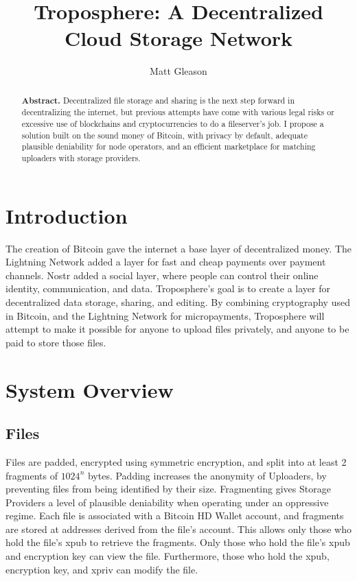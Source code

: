 \documentclass[12pt]{article}
\title{Troposphere: A Decentralized Cloud Storage Network}
\author{Matt Gleason}
\date{}
\begin{document}
\maketitle

\begin{abstract}\noindent \textbf{Abstract.} Decentralized file storage and sharing is the next step forward in decentralizing the internet, but previous attempts have come with various legal risks or excessive use of blockchains and cryptocurrencies to do a fileserver's job. I propose a solution built on the sound money of Bitcoin, with privacy by default, adequate plausible deniability for node operators, and an efficient marketplace for matching uploaders with storage providers.
\end{abstract}

\section{Introduction}

The creation of Bitcoin gave the internet a base layer of decentralized money. The Lightning Network added a layer for fast and cheap payments over payment channels. Nostr added a social layer, where people can control their online identity, communication, and data. Troposphere's goal is to create a layer for decentralized data storage, sharing, and editing. By combining cryptography used in Bitcoin, and the Lightning Network for micropayments, Troposphere will attempt to make it possible for anyone to upload files privately, and anyone to be paid to store those files.

\section{System Overview}

\subsection{Files}

Files are padded, encrypted using symmetric encryption, and split into at least 2 fragments of $1024^n$ bytes. Padding increases the anonymity of Uploaders, by preventing files from being identified by their size. Fragmenting gives Storage Providers a level of plausible deniability when operating under an oppressive regime. Each file is associated with a Bitcoin HD Wallet account, and fragments are stored at addresses derived from the file's account. This allows only those who hold the file's xpub to retrieve the fragments. Only those who hold the file's xpub and encryption key can view the file. Furthermore, those who hold the xpub, encryption key, and xpriv can modify the file.
\end{document}
